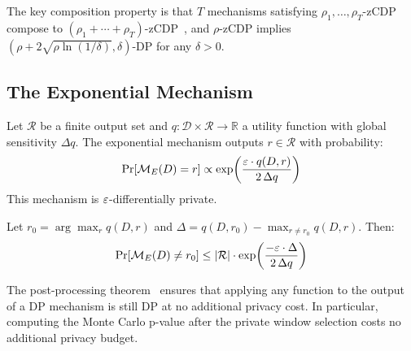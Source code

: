 The key composition property is that $T$ mechanisms satisfying
$\rho_1, \ldots, \rho_T$-zCDP compose to $(\rho_1 + \cdots + \rho_T)$-zCDP~\cite{bun2016},
and $\rho$-zCDP implies $(\rho + 2\sqrt{\rho \ln(1/\delta)}, \delta)$-DP for any $\delta > 0$.


\subsection{The Exponential Mechanism}
\label{sec:background:expomech}

\begin{definition}
Let $\mathcal{R}$ be a finite output set and $q: \mathcal{D} \times \mathcal{R} \to \mathbb{R}$
a utility function with global sensitivity $\Delta q$.
The exponential mechanism outputs $r \in \mathcal{R}$ with probability:
\[
    \Pr[\mathcal{M}_E(D) = r] \propto \exp\!\left(\frac{\varepsilon \cdot q(D,r)}{2\,\Delta q}\right)
\]
This mechanism is $\varepsilon$-differentially private.
\end{definition}

\begin{theorem}
\label{thm:mst-utility}
Let $r_0 = \arg\max_r q(D,r)$ and $\Delta = q(D,r_0) - \max_{r \neq r_0} q(D,r)$.
Then:
\[
    \Pr[\mathcal{M}_E(D) \neq r_0] \leq |\mathcal{R}| \cdot \exp\!\left(\frac{-\varepsilon \cdot \Delta}{2\,\Delta q}\right)
\]
\end{theorem}

The post-processing theorem~\cite[Proposition~2.1]{dwork2013} ensures that applying
any function to the output of a DP mechanism is still DP at no additional privacy cost.
In particular, computing the Monte Carlo p-value after the private window selection
costs no additional privacy budget.
